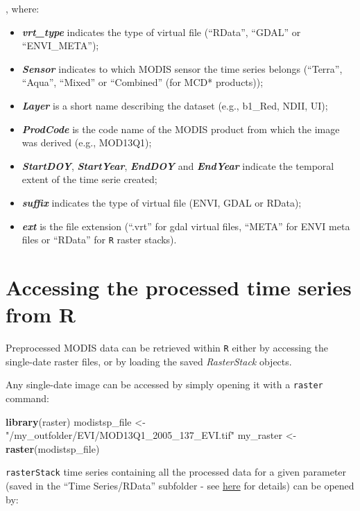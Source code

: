 \documentclass[]{article}
\newenvironment{Shaded}{\begin{snugshade}}{\end{snugshade}}
\newcommand{\KeywordTok}[1]{\textcolor[rgb]{0.13,0.29,0.53}{\textbf{#1}}}
\newcommand{\StringTok}[1]{\textcolor[rgb]{0.31,0.60,0.02}{#1}}
\newcommand{\NormalTok}[1]{#1}
\providecommand{\tightlist}{%
  \setlength{\itemsep}{0pt}\setlength{\parskip}{0pt}}
\begin{document}
, where:

\begin{itemize}
\tightlist
\item
  \textbf{\emph{vrt\_type}} indicates the type of virtual file
  (``RData'', ``GDAL'' or ``ENVI\_META'');
\item
  \textbf{\emph{Sensor}} indicates to which MODIS sensor the time series
  belongs (``Terra'', ``Aqua'', ``Mixed'' or ``Combined'' (for MCD*
  products));
\item
  \textbf{\emph{Layer}} is a short name describing the dataset (e.g.,
  b1\_Red, NDII, UI);
\item
  \textbf{\emph{ProdCode}} is the code name of the MODIS product from
  which the image was derived (e.g., MOD13Q1);
\item
  \textbf{\emph{StartDOY}}, \textbf{\emph{StartYear}},
  \textbf{\emph{EndDOY}} and \textbf{\emph{EndYear}} indicate the
  temporal extent of the time serie created;
\item
  \textbf{\emph{suffix}} indicates the type of virtual file (ENVI, GDAL
  or RData);
\item
  \textbf{\emph{ext}} is the file extension (``.vrt'' for gdal virtual
  files, ``META'' for ENVI meta files or ``RData'' for \texttt{R} raster
  stacks).
\end{itemize}

\section{Accessing the processed time series from
R}\label{accessing-the-processed-time-series-from-r}

Preprocessed MODIS data can be retrieved within \texttt{R} either by
accessing the single-date raster files, or by loading the saved
\emph{RasterStack} objects.

Any single-date image can be accessed by simply opening it with a
\texttt{raster} command:

\begin{Shaded}
\begin{Highlighting}[]
\KeywordTok{library}\NormalTok{(raster)}
\NormalTok{modistsp_file <-}\StringTok{ "/my_outfolder/EVI/MOD13Q1_2005_137_EVI.tif"}
\NormalTok{my_raster <-}\StringTok{ }\KeywordTok{raster}\NormalTok{(modistsp_file)}
\end{Highlighting}
\end{Shaded}

\texttt{rasterStack} time series containing all the processed data for a
given parameter (saved in the ``Time Series/RData'' subfolder - see
\href{output.html}{here} for details) can be opened by:
\end{document}
